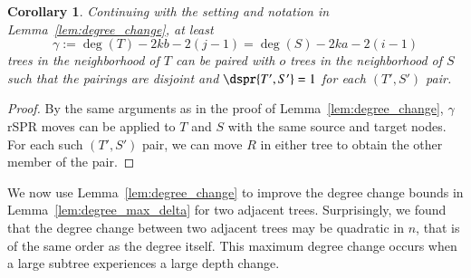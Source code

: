 \documentclass[]{elsarticle}
\newtheorem{cor}[thm]{Corollary}
\newcommand{\overlap}{%
	\gamma
}
\begin{document}
\begin{cor}
\label{cor:paired_neighbors}
Continuing with the setting and notation in Lemma~\ref{lem:degree_change}, at least
$$\overlap := \deg(T) - 2kb - 2(j-1) = \deg(S) - 2ka - 2(i-1)$$
trees in the neighborhood of $T$ can be paired with $o$ trees in the neighborhood of $S$ such that the pairings are disjoint and $\dspr{T',S'} = 1$ for each $(T',S')$ pair.
\end{cor}
\begin{proof}
By the same arguments as in the proof of Lemma~\ref{lem:degree_change}, $\overlap$ rSPR moves can be applied to $T$ and $S$ with the same source and target nodes.
For each such $(T',S')$ pair, we can move $R$ in either tree to obtain the other member of the pair.
\end{proof}

We now use Lemma~\ref{lem:degree_change} to improve the degree change bounds in Lemma~\ref{lem:degree_max_delta} for two adjacent trees.
Surprisingly, we found that the degree change between two adjacent trees may be quadratic in $n$, that is of the same order as the degree itself.
This maximum degree change occurs when a large subtree experiences a large depth change.
\end{document}
